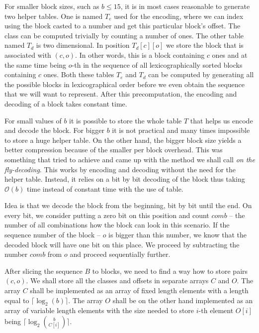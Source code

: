 For smaller block sizes, such as $b\leq 15$, it is in most cases reasonable to
generate two helper tables. One is named $T_e$ used for the encoding, where we can
index using the block casted to a number and get this particular block's offset.
The class can be computed trivially by counting a number of ones. The other table
named $T_d$ is two dimensional. In position $T_d[c][o]$ we store the block that
is associated with $(c, o)$. In other words, this is a block containing $c$ ones
and at the same time being $o$-th in the sequence of all lexicographically sorted
blocks containing $c$ ones. Both these tables $T_e$ and $T_d$ can be computed
by generating all the possible blocks in lexicographical order before we even
obtain the sequence that we will want to represent. After this precomputation,
the encoding and decoding of a block takes constant time.

For small values of $b$ it is possible to store the whole table $T$ that helps us
encode and decode the block. For bigger $b$ it is not practical and many times
impossible to store a huge helper table. On the other hand, the bigger block size
yields a better compression because of the smaller per block overhead. This was
something that \cite{navarro2012fast} tried to achieve and came up with the method
we shall call \textit{on the fly-decoding}. This works by encoding and decoding without
the need for the helper table. Instead, it relies on a bit by bit decoding of the block
thus taking $\mathcal{O}(b)$ time instead of constant time with the use of table.

Idea is that we decode the block from the beginning, bit by bit until the end. On every bit,
we consider putting a zero bit on this position and count $comb$ -- the number of all
combinations how the block can look in this scenario. If the sequence number of the block --
$o$ is bigger than this number, we know that the decoded block will have one bit on this place.
We proceed by subtracting the number $comb$ from $o$ and proceed sequentially further.

After slicing the sequence $B$ to blocks, we need to find a way how to store pairs $(c, o)$.
We shall store all the classes and offsets in separate arrays $C$ and $O$. The array $C$ shall
be implemented as an array of fixed length elements with a length equal to
$\lceil \log_2(b)\rceil$. The array $O$ shall be on the other hand implemented as an array of
variable length elements with the size needed to store $i$-th element $O[i]$ being
$\lceil \log_2{b\choose C[i]}\rceil$.

